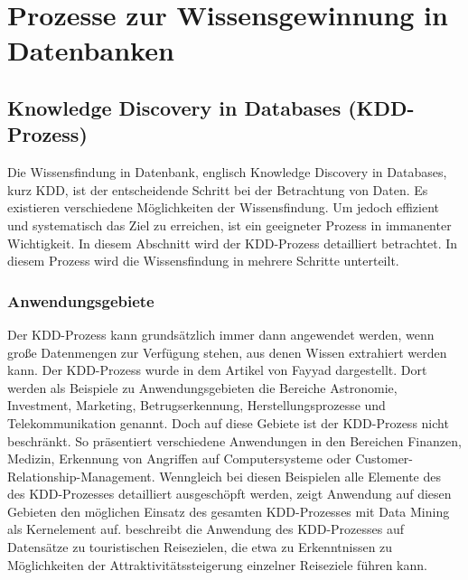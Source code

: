 %
%


\chapter{Prozesse zur Wissensgewinnung in Datenbanken}

\section{Knowledge Discovery in Databases (KDD-Prozess)}

Die Wissensfindung in Datenbank, englisch Knowledge Discovery in Databases, kurz KDD, ist der entscheidende Schritt bei der Betrachtung von Daten. Es existieren verschiedene Möglichkeiten der Wissensfindung. Um jedoch effizient und systematisch das Ziel zu erreichen, ist ein geeigneter Prozess in immanenter Wichtigkeit. In diesem Abschnitt wird der KDD-Prozess detailliert betrachtet. In diesem Prozess wird die Wissensfindung in mehrere Schritte unterteilt.  \cite{Dusing.2000}

\subsection{Anwendungsgebiete}
Der KDD-Prozess kann grundsätzlich immer dann angewendet werden, wenn große Datenmengen zur Verfügung stehen, aus denen Wissen extrahiert werden kann. Der KDD-Prozess wurde in dem Artikel von Fayyad dargestellt. \cite{Fayyad:1996}  Dort werden als Beispiele zu Anwendungsgebieten die Bereiche Astronomie, Investment, Marketing, Betrugserkennung, Herstellungsprozesse und Telekommunikation genannt. Doch auf diese Gebiete ist der KDD-Prozess nicht beschränkt. So präsentiert \cite{Maimon:2010} verschiedene Anwendungen in den Bereichen Finanzen, Medizin, Erkennung von Angriffen auf Computersysteme oder Customer-Relationship-Management. Wenngleich bei diesen Beispielen alle Elemente des des KDD-Prozesses detailliert ausgeschöpft werden, zeigt Anwendung auf diesen Gebieten den möglichen Einsatz des gesamten KDD-Prozesses mit Data Mining als Kernelement auf. \cite{Pyo:2002} beschreibt die Anwendung des KDD-Prozesses auf Datensätze zu touristischen Reisezielen, die etwa zu Erkenntnissen zu Möglichkeiten der Attraktivitätssteigerung einzelner Reiseziele führen kann.

